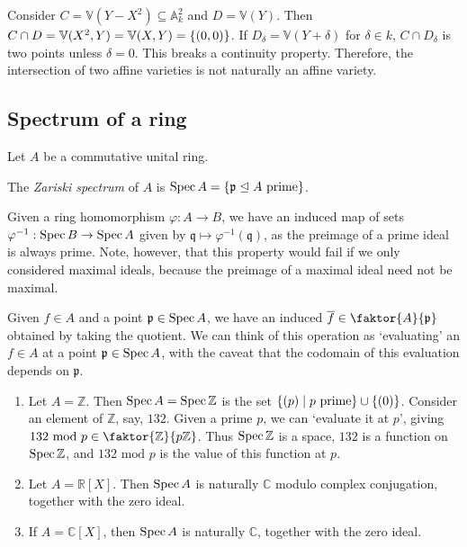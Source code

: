 Consider \( C = \mathbb V(Y - X^2) \subseteq \mathbb A^2_k \) and \( D = \mathbb V(Y) \).
Then \( C \cap D = \mathbb V(X^2, Y) = \mathbb V(X, Y) = \qty{(0, 0)} \).
If \( D_\delta = \mathbb V(Y + \delta) \) for \( \delta \in k \), \( C \cap D_\delta \) is two points unless \( \delta = 0 \).
This breaks a continuity property.
Therefore, the intersection of two affine varieties is not naturally an affine variety.

\subsection{Spectrum of a ring}
Let \( A \) be a commutative unital ring.
\begin{definition}
    The \emph{Zariski spectrum} of \( A \) is \( \operatorname{Spec} A = \qty{\mathfrak p \trianglelefteq A \text{ prime}} \).
\end{definition}
\begin{remark}
    Given a ring homomorphism \( \varphi : A \to B \), we have an induced map of sets \( \varphi^{-1} : \operatorname{Spec} B \to \operatorname{Spec} A \) given by \( \mathfrak q \mapsto \varphi^{-1}(\mathfrak q) \), as the preimage of a prime ideal is always prime.
    Note, however, that this property would fail if we only considered maximal ideals, because the preimage of a maximal ideal need not be maximal.

    Given \( f \in A \) and a point \( \mathfrak p \in \operatorname{Spec} A \), we have an induced \( \overline f \in \faktor{A}{\mathfrak p} \) obtained by taking the quotient.
    We can think of this operation as `evaluating' an \( f \in A \) at a point \( \mathfrak p \in \operatorname{Spec} A \), with the caveat that the codomain of this evaluation depends on \( \mathfrak p \).
\end{remark}
\begin{example}
    \begin{enumerate}
        \item Let \( A = \mathbb Z \).
        Then \( \operatorname{Spec} A = \operatorname{Spec} \mathbb Z \) is the set \( \qty{(p) \mid p \text{ prime}} \cup \qty{(0)} \).
        Consider an element of \( \mathbb Z \), say, \( 132 \).
        Given a prime \( p \), we can `evaluate it at \( p \)', giving \( 132 \text{ mod } p \in \faktor{\mathbb Z}{p\mathbb Z} \).
        Thus \( \operatorname{Spec} \mathbb Z \) is a space, \( 132 \) is a function on \( \operatorname{Spec} \mathbb Z \), and \( 132 \text{ mod } p \) is the value of this function at \( p \).
        \item Let \( A = \mathbb R[X] \).
        Then \( \operatorname{Spec} A \) is naturally \( \mathbb C \) modulo complex conjugation, together with the zero ideal.
        \item If \( A = \mathbb C[X] \), then \( \operatorname{Spec} A \) is naturally \( \mathbb C \), together with the zero ideal.
    \end{enumerate}
\end{example}

